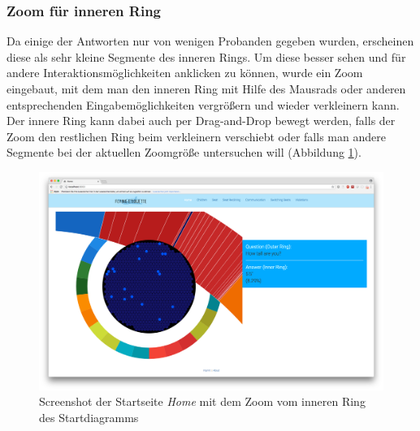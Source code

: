\documentclass{mi-seminar}
\begin{document}
\subsubsection{Zoom für inneren Ring}
Da einige der Antworten nur von wenigen Probanden gegeben wurden, erscheinen diese als sehr kleine Segmente des inneren Rings. Um diese besser sehen und für andere Interaktionsmöglichkeiten anklicken zu können, wurde ein Zoom eingebaut, mit dem man den inneren Ring mit Hilfe des Mausrads oder anderen entsprechenden Eingabemöglichkeiten vergrößern und wieder verkleinern kann. Der innere Ring kann dabei auch per Drag-and-Drop bewegt werden, falls der Zoom den restlichen Ring beim verkleinern verschiebt oder falls man andere Segmente bei der aktuellen Zoomgröße untersuchen will (Abbildung \ref{ScStartDiagramZoom}).
\begin{figure}
\includegraphics[scale=0.3]{assets/start_inner_ring_zoom.png}
\caption{Screenshot der Startseite \textit{Home} mit dem Zoom vom inneren Ring des Startdiagramms}
\label{ScStartDiagramZoom}
\end{figure}
\end{document}
